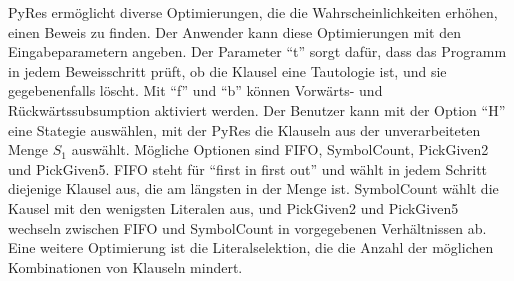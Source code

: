 PyRes ermöglicht diverse Optimierungen, die die Wahrscheinlichkeiten erhöhen, einen Beweis zu finden.
Der Anwender kann diese Optimierungen mit den Eingabeparametern angeben. Der Parameter "`t"' sorgt dafür, dass das Programm in jedem Beweisschritt prüft, ob die Klausel eine Tautologie ist, und sie gegebenenfalls löscht. Mit "`f"' und "`b"' können Vorwärts- und Rückwärtssubsumption aktiviert werden.
Der Benutzer kann mit der Option "`H"' eine Stategie auswählen, mit der PyRes die Klauseln aus der unverarbeiteten Menge $S_1$ auswählt. Mögliche Optionen sind FIFO, SymbolCount, PickGiven2 und PickGiven5. FIFO steht für "`first in first out"' und wählt in jedem Schritt diejenige Klausel aus, die am längsten in der Menge ist. SymbolCount wählt die Kausel mit den wenigsten Literalen aus, und PickGiven2 und PickGiven5 wechseln zwischen FIFO und SymbolCount in vorgegebenen Verhältnissen ab. Eine weitere Optimierung ist die Literalselektion, die die Anzahl der möglichen Kombinationen von Klauseln mindert.